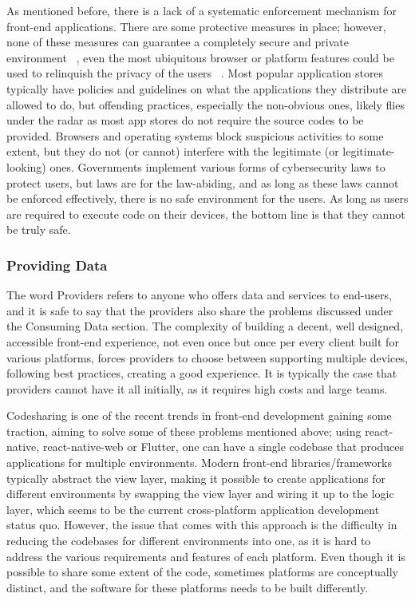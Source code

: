 As mentioned before, there is a lack of a systematic enforcement mechanism for front-end applications. There are some protective measures in place; however, none of these measures can guarantee a completely secure and private environment ~\cite{TrackingWeb}, even the most ubiquitous browser or platform features could be used to relinquish the privacy of the users ~\cite{TrackingFavicon}. Most popular application stores typically have policies and guidelines on what the applications they distribute are allowed to do, but offending practices, especially the non-obvious ones, likely flies under the radar as most app stores do not require the source codes to be provided. Browsers and operating systems block suspicious activities to some extent, but they do not (or cannot) interfere with the legitimate (or legitimate-looking) ones. Governments implement various forms of cybersecurity laws to protect users, but laws are for the law-abiding, and as long as these laws cannot be enforced effectively, there is no safe environment for the users. As long as users are required to execute code on their devices, the bottom line is that they cannot be truly safe.

\subsubsection{Providing Data}

The word Providers refers to anyone who offers data and services to end-users, and it is safe to say that the providers also share the problems discussed under the Consuming Data section. The complexity of building a decent, well designed, accessible front-end experience, not even once but once per every client built for various platforms, forces providers to choose between supporting multiple devices, following best practices, creating a good experience. It is typically the case that providers cannot have it all initially, as it requires high costs and large teams. 

Codesharing is one of the recent trends in front-end development gaining some traction, aiming to solve some of these problems mentioned above; using react-native, react-native-web or Flutter, one can have a single codebase that produces applications for multiple environments. Modern front-end libraries/frameworks typically abstract the view layer, making it possible to create applications for different environments by swapping the view layer and wiring it up to the logic layer, which seems to be the current cross-platform application development status quo. However, the issue that comes with this approach is the difficulty in reducing the codebases for different environments into one, as it is hard to address the various requirements and features of each platform. Even though it is possible to share some extent of the code, sometimes platforms are conceptually distinct, and the software for these platforms needs to be built differently. 


